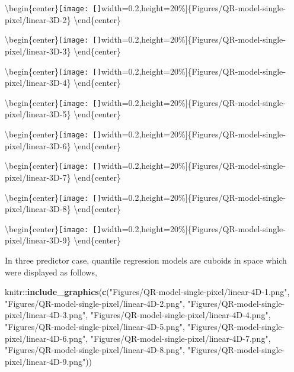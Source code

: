 \documentclass[11pt,a4paper,]{article}
\newenvironment{Shaded}{\begin{snugshade}}{\end{snugshade}}
\newcommand{\KeywordTok}[1]{\textcolor[rgb]{0.13,0.29,0.53}{\textbf{{#1}}}}
\newcommand{\StringTok}[1]{\textcolor[rgb]{0.31,0.60,0.02}{{#1}}}
\newcommand{\NormalTok}[1]{{#1}}
\theoremstyle{definition}
\theoremstyle{definition}
\theoremstyle{remark}
\begin{document}
\textbackslash{}begin\{center\}\texttt{[image: []}width=0.2\linewidth,height=20\%{]}\{Figures/QR-model-single-pixel/linear-3D-2\}
\textbackslash{}end\{center\}

\textbackslash{}begin\{center\}\texttt{[image: []}width=0.2\linewidth,height=20\%{]}\{Figures/QR-model-single-pixel/linear-3D-3\}
\textbackslash{}end\{center\}

\textbackslash{}begin\{center\}\texttt{[image: []}width=0.2\linewidth,height=20\%{]}\{Figures/QR-model-single-pixel/linear-3D-4\}
\textbackslash{}end\{center\}

\textbackslash{}begin\{center\}\texttt{[image: []}width=0.2\linewidth,height=20\%{]}\{Figures/QR-model-single-pixel/linear-3D-5\}
\textbackslash{}end\{center\}

\textbackslash{}begin\{center\}\texttt{[image: []}width=0.2\linewidth,height=20\%{]}\{Figures/QR-model-single-pixel/linear-3D-6\}
\textbackslash{}end\{center\}

\textbackslash{}begin\{center\}\texttt{[image: []}width=0.2\linewidth,height=20\%{]}\{Figures/QR-model-single-pixel/linear-3D-7\}
\textbackslash{}end\{center\}

\textbackslash{}begin\{center\}\texttt{[image: []}width=0.2\linewidth,height=20\%{]}\{Figures/QR-model-single-pixel/linear-3D-8\}
\textbackslash{}end\{center\}

\textbackslash{}begin\{center\}\texttt{[image: []}width=0.2\linewidth,height=20\%{]}\{Figures/QR-model-single-pixel/linear-3D-9\}
\textbackslash{}end\{center\}

In three predictor case, quantile regression models are cuboids in space
which were displayed as follows,

\begin{Shaded}
\begin{Highlighting}[]
\NormalTok{knitr::}\KeywordTok{include_graphics}\NormalTok{(}\KeywordTok{c}\NormalTok{(}\StringTok{"Figures/QR-model-single-pixel/linear-4D-1.png"}\NormalTok{,}
                          \StringTok{"Figures/QR-model-single-pixel/linear-4D-2.png"}\NormalTok{,}
                          \StringTok{"Figures/QR-model-single-pixel/linear-4D-3.png"}\NormalTok{,}
                          \StringTok{"Figures/QR-model-single-pixel/linear-4D-4.png"}\NormalTok{,}
                          \StringTok{"Figures/QR-model-single-pixel/linear-4D-5.png"}\NormalTok{,}
                          \StringTok{"Figures/QR-model-single-pixel/linear-4D-6.png"}\NormalTok{,}
                          \StringTok{"Figures/QR-model-single-pixel/linear-4D-7.png"}\NormalTok{,}
                          \StringTok{"Figures/QR-model-single-pixel/linear-4D-8.png"}\NormalTok{,}
                          \StringTok{"Figures/QR-model-single-pixel/linear-4D-9.png"}\NormalTok{))}
\end{Highlighting}
\end{Shaded}
\end{document}
